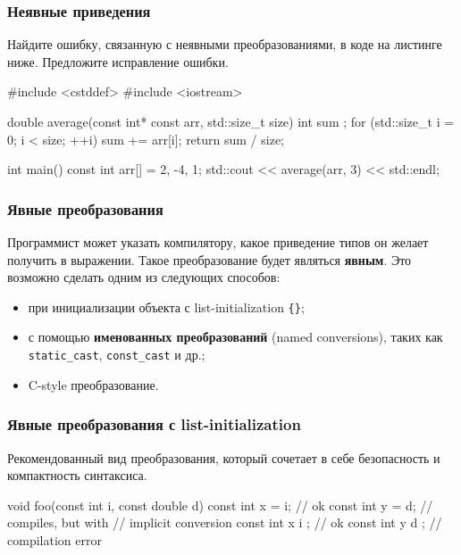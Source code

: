 \documentclass[compress, 8pt]{beamer}
\begin{document}
\begin{frame}[fragile]

    \frametitle{Неявные приведения}

    \hfill\break
    \begin{task}
        Найдите ошибку, связанную с неявными преобразованиями, в коде на листинге
        ниже.
        Предложите исправление ошибки.
    \end{task}

    \begin{myinplacelisting}[minted language=cpp]
#include <cstddef>
#include <iostream>

double average(const int* const arr, std::size_t size) {
    int sum {};
    for (std::size_t i = 0; i < size; ++i) {
        sum += arr[i];
    }
    return sum / size;
}

int main() {
    const int arr[] = {2, -4, 1};
    std::cout << average(arr, 3) << std::endl;
}
    \end{myinplacelisting}

\end{frame}

\begin{frame}[fragile]

    \frametitle{Явные преобразования}

    Программист может указать компилятору, какое приведение типов он желает получить
    в выражении.
    Такое преобразование будет являться \textbf{явным}.
    Это возможно сделать одним из следующих способов:

    \begin{itemize}
        \item при инициализации объекта с list-initialization \verb|{}|;
        \item с помощью \textbf{именованных преобразований} (named conversions),
            таких как \verb|static_cast|, \verb|const_cast| и др.;
        \item C-style преобразование.
    \end{itemize}

\end{frame}

\begin{frame}[fragile]

    \frametitle{Явные преобразования с list-initialization}

    Рекомендованный вид преобразования, который сочетает в себе безопасность
    и компактность синтаксиса.

    \begin{myinplacelisting}[minted language=cpp]
void foo(const int i, const double d) {
    {
        const int x = i; // ok
        const int y = d; // compiles, but with
                         // implicit conversion
    }
    {
        const int x { i }; // ok
        const int y { d }; // compilation error
    }
}
    \end{myinplacelisting}

\end{frame}
\end{document}
